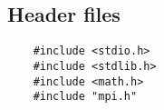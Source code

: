 \subsection{Header files}
\begin{lstlisting}
    #include <stdio.h>
    #include <stdlib.h>
    #include <math.h>
    #include "mpi.h"
\end{lstlisting}


